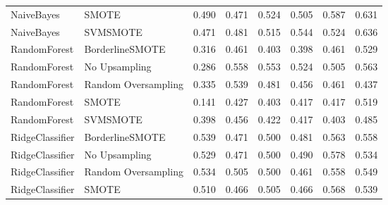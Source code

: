 \begin{tabular}{llllllll}
                  NaiveBayes &               SMOTE &     0.490 &                     0.471 &                 0.524 &                  0.505 &                                   0.587 &     0.631 \\
                  NaiveBayes &            SVMSMOTE &     0.471 &                     0.481 &                 0.515 &                  0.544 &                                   0.524 &     0.636 \\
                RandomForest &     BorderlineSMOTE &     0.316 &                     0.461 &                 0.403 &                  0.398 &                                   0.461 &     0.529 \\
                RandomForest &       No Upsampling &     0.286 &                     0.558 &                 0.553 &                  0.524 &                                   0.505 &     0.563 \\
                RandomForest & Random Oversampling &     0.335 &                     0.539 &                 0.481 &                  0.456 &                                   0.461 &     0.437 \\
                RandomForest &               SMOTE &     0.141 &                     0.427 &                 0.403 &                  0.417 &                                   0.417 &     0.519 \\
                RandomForest &            SVMSMOTE &     0.398 &                     0.456 &                 0.422 &                  0.417 &                                   0.403 &     0.485 \\
             RidgeClassifier &     BorderlineSMOTE &     0.539 &                     0.471 &                 0.500 &                  0.481 &                                   0.563 &     0.558 \\
             RidgeClassifier &       No Upsampling &     0.529 &                     0.471 &                 0.500 &                  0.490 &                                   0.578 &     0.534 \\
             RidgeClassifier & Random Oversampling &     0.534 &                     0.505 &                 0.500 &                  0.461 &                                   0.558 &     0.549 \\
             RidgeClassifier &               SMOTE &     0.510 &                     0.466 &                 0.505 &                  0.466 &                                   0.568 &     0.539 \\

\end{tabular}
